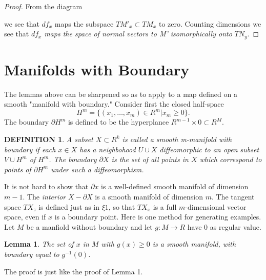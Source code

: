 \documentclass[12pt, openany, closeany]{book}
\newtheorem{lemma}{Lemma}
\theoremstyle{corollary}
\newtheorem*{definition}{DEFINITION}
\begin{document}
  \begin{proof}
	  From the diagram
	  \begin{center}
	  \end{center}
	  we see that $df_{x}$ maps the subspace $TM'_{x} \subset TM_{x}$ to zero. Counting dimensions we see that $df_{x}$ \emph{maps the space of normal vectors to M' isomorphically onto} $TN_{y}$.
  \end{proof}


  \section{Manifolds with Boundary}

  The lemmas above can be sharpened so as to apply to a map defined on a smooth "manifold with boundary." Consider first the closed half-space
  \[
	   H^m = \{(x_{1},\ldots, x_{m})\in R^m | x_{m}\geq 0\}.
   \]
  The boundary $\partial H^m$ is defined to be the hyperplance $R^{m-1} \times 0 \subset R^M$.

  \begin{definition}
	   A subset $X \subset R^k$ is called a \emph{smooth m-manifold with boundary} if each $x\in X$ has a neighbohood $U \cup X$ diffeomorphic to an open subset $V\cup H^m$ of $H^m$. The \emph{boundary} ${\partial X}$ is the set of all points in $X$ which correspond to points of $\partial H^m$ under such a diffeomorphism.
  \end{definition}

  It is not hard to show that $\partial x$ is a well-defined smooth manifold of dimension $m - 1$. The \emph{interior} $X - \partial X$ is a smooth manifold of dimension $m$.
  The tangent space $TX_{z}$ is defined just as in $\xi 1$, so that $TX_{x}$ is a full $m$-dimensional vector space, even if $x$ is a boundary point.
  Here is one method for generating examples. Let $M$ be a manfiold without boundary and let $g : M \to R$ have $0$ as regular value.

  \begin{lemma}
	   The set of $x$ in $M$ with $g(x) \geq 0$ is a smooth manifold, with boundary equal to $g^{-1}(0)$.
  \end{lemma}

  The proof is just like the proof of Lemma 1.
\end{document}
